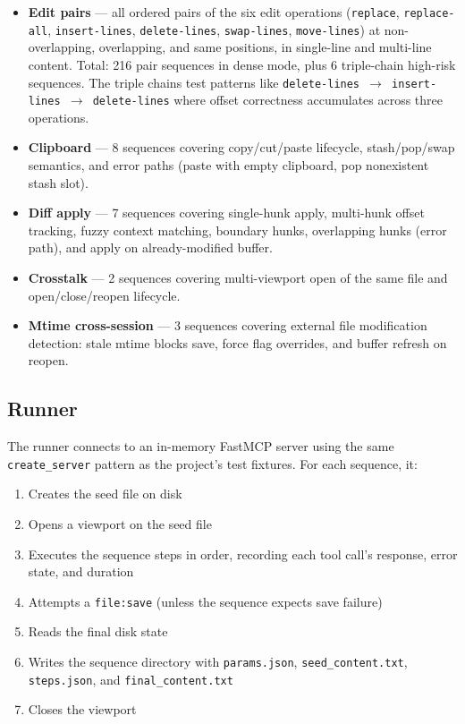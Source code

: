 \documentclass{article}
\begin{document}
\begin{itemize}
\item \textbf{Edit pairs} --- all ordered pairs of the six edit operations
(\texttt{replace}, \texttt{replace-all}, \texttt{insert-lines},
\texttt{delete-lines}, \texttt{swap-lines}, \texttt{move-lines}) at
non-overlapping, overlapping, and same positions, in single-line and multi-line
content. Total: 216 pair sequences in dense mode, plus 6 triple-chain
high-risk sequences. The triple chains test patterns like
\texttt{delete-lines $\rightarrow$ insert-lines $\rightarrow$ delete-lines}
where offset correctness accumulates across three operations.

\item \textbf{Clipboard} --- 8 sequences covering copy/cut/paste lifecycle,
stash/pop/swap semantics, and error paths (paste with empty clipboard, pop
nonexistent stash slot).

\item \textbf{Diff apply} --- 7 sequences covering single-hunk apply,
multi-hunk offset tracking, fuzzy context matching, boundary hunks, overlapping
hunks (error path), and apply on already-modified buffer.

\item \textbf{Crosstalk} --- 2 sequences covering multi-viewport open of the
same file and open/close/reopen lifecycle.

\item \textbf{Mtime cross-session} --- 3 sequences covering external file
modification detection: stale mtime blocks save, force flag overrides, and
buffer refresh on reopen.
\end{itemize}

\subsection{Runner}
\label{sec:runner}

The runner connects to an in-memory FastMCP server using the same
\texttt{create\_server} pattern as the project's test fixtures. For each
sequence, it:

\begin{enumerate}
\item Creates the seed file on disk
\item Opens a viewport on the seed file
\item Executes the sequence steps in order, recording each tool call's
response, error state, and duration
\item Attempts a \texttt{file:save} (unless the sequence expects save failure)
\item Reads the final disk state
\item Writes the sequence directory with \texttt{params.json},
\texttt{seed\_content.txt}, \texttt{steps.json}, and \texttt{final\_content.txt}
\item Closes the viewport
\end{enumerate}
\end{document}
